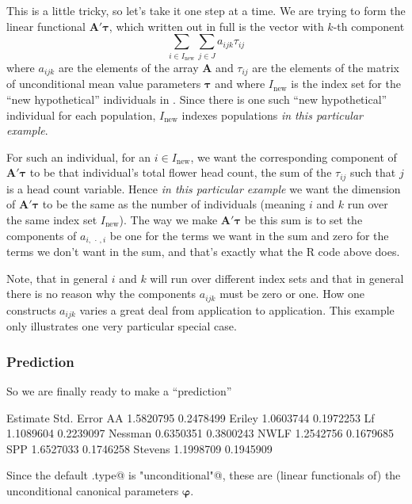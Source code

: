 \documentclass[11pt]{article}
\newcommand{\boldtau}{{\boldsymbol{\tau}}}
\newcommand{\boldvarphi}{{\boldsymbol{\varphi}}}
\newcommand{\boldA}{{\mathbf{A}}}
\begin{document}
This is a little tricky, so let's take it one step at a time.  We are
trying to form the linear functional $\boldA' \boldtau$, which written
out in full is the vector with $k$-th component
$$
   \sum_{i \in I_{\text{new}}} \sum_{j \in J} a_{i j k} \tau_{i j}
$$
where $a_{i j k}$ are the elements of the array $\boldA$ and $\tau_{i j}$
are the elements of the matrix of unconditional mean value
parameters $\boldtau$ and where $I_{\text{new}}$ is the index set for
the ``new hypothetical'' individuals in \verb@newdata@.  Since there
is one such ``new hypothetical'' individual for each population,
$I_{\text{new}}$ indexes populations \emph{in this particular example}.

For such an individual, for an $i \in I_{\text{new}}$, we want the
corresponding component of $\boldA' \boldtau$ to be that individual's
total flower head count, the sum of the $\tau_{i j}$ such that $j$ is
a head count variable.  Hence \emph{in this particular example} we want
the dimension of $\boldA' \boldtau$ to be the same as the number of
individuals (meaning $i$ and $k$ run over the same index set $I_{\text{new}}$).
The way we make $\boldA' \boldtau$ be this sum is to set the components of
$a_{i, \,\cdot\,, i}$ be one for the terms we want in the sum and zero
for the terms we don't want in the sum, and that's exactly what the R
code above does.

Note, that in general $i$ and $k$ will run over different index sets
and that in general there is no reason why the components $a_{i j k}$
must be zero or one.  How one constructs $a_{i j k}$ varies a great deal
from application to application.  This example only illustrates one very
particular special case.

\subsubsection{Prediction}

So we are finally ready to make a ``prediction''
\begin{Schunk}
\begin{Soutput}
         Estimate Std. Error
AA      1.5820795  0.2478499
Eriley  1.0603744  0.1972253
Lf      1.1089604  0.2239097
Nessman 0.6350351  0.3800243
NWLF    1.2542756  0.1679685
SPP     1.6527033  0.1746258
Stevens 1.1998709  0.1945909
\end{Soutput}
\end{Schunk}
Since the default \verb@model.type@ is \verb@"unconditional"@, these are
(linear functionals of) the unconditional canonical parameters $\boldvarphi$.
\end{document}
